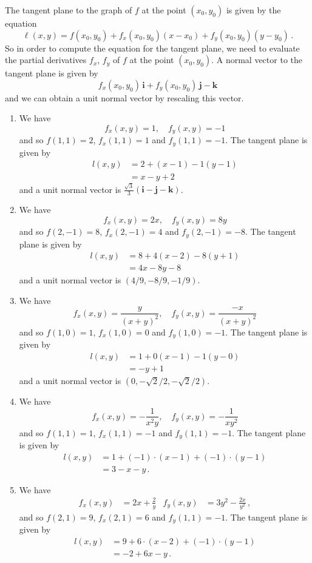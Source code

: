 \begin{solution}
The tangent plane to the graph of $f$ at the point $(x_0,y_0)$ is given by the equation
\[
\ell(x,y) = f(x_0,y_0) + f_x(x_0,y_0)(x-x_0) + f_y(x_0,y_0)(y-y_0)\,.
\]
So in order to compute the equation for the tangent plane, we need to evaluate the partial derivatives $f_x$, $f_y$ of $f$ at the point $(x_0,y_0)$. A normal vector to the tangent plane is given by
\[
f_x(x_0,y_0)\,\bm{i} + f_y(x_0,y_0)\,\bm{j} -\bm{k}
\]
and we can obtain a unit normal vector by rescaling this vector.

\begin{enumerate}
\item
We have
\[
f_x(x,y) = 1, \quad f_y(x,y) = -1
\]
and so $f(1,1) = 2$, $f_x(1,1) = 1$ and $f_y(1,1) = -1$. The tangent plane is given by
\begin{align*}
l(x,y) &= 2 + (x-1) -1 (y-1) \\
&= x-y+2
\end{align*}
and a unit normal vector is $\frac{\sqrt{3}}3 \left(\bm i - \bm j - \bm k\right)$.

\item
We have
\[
f_x(x,y) = 2x, \quad f_y(x,y) = 8y
\]
and so $f(2,-1) = 8$, $f_x(2,-1) = 4$ and $f_y(2,-1) = -8$. The tangent plane is given by
\begin{align*}
l(x,y) &= 8 + 4(x-2) -8 (y+1) \\
&= 4x-8y - 8
\end{align*}
and a unit normal vector is $(4/9, -8/9, -1/9)$.

\item
We have
\[
f_x(x,y) = \frac{y}{(x+y)^2}, \quad f_y(x,y) = \frac{-x}{(x+y)^2}
\]
and so $f(1,0) = 1$, $f_x(1,0) = 0$ and $f_y(1,0) = -1$. The tangent plane is given by
\begin{align*}
l(x,y) &= 1 + 0(x-1) -1(y-0) \\
&= -y+1
\end{align*}
and a unit normal vector is $(0, -\sqrt{2}/2, -\sqrt{2}/2)$.

\item
We have
\[
f_x(x,y) = -\frac{1}{x^2 y}, \quad f_y(x,y) = -\frac{1}{xy^2}
\]
and so $f(1,1) = 1$, $f_x(1,1) = -1$ and $f_y(1,1) = -1$. The tangent plane is given by
\begin{align*}
l(x,y) &= 1 +(-1)\cdot(x-1) +(-1)\cdot(y-1) \\
&= 3-x-y\,.
\end{align*}

\item
We have
\begin{align*}
f_x(x,y) &= 2x + \frac{2}{y} &
f_y(x,y) &= 3y^2 - \frac{2x}{y^2}\,,
\end{align*}
and so $f(2,1) = 9$, $f_x(2,1) = 6$ and $f_y(1,1) = -1$. The tangent plane is given by
\begin{align*}
l(x,y) &= 9 +6\cdot(x-2) +(-1)\cdot(y-1) \\
&= -2+6x-y\,.
\end{align*}


\end{enumerate}
\end{solution}
